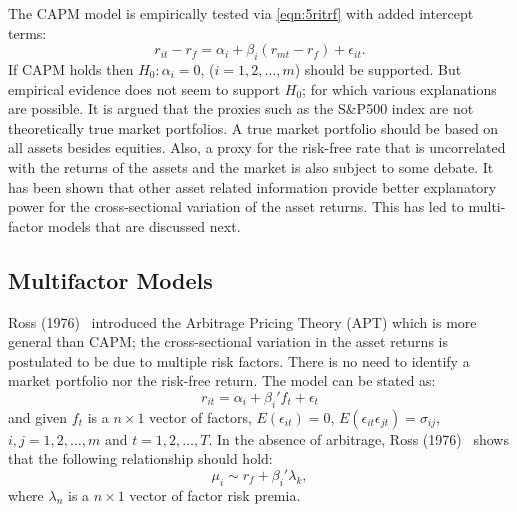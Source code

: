 \noindent The CAPM model is empirically tested via \eqref{eqn:5ritrf} with added intercept terms:
	\begin{equation}\label{eqn:intercept}
	r_{it} - r_f = \alpha_i + \beta_i (r_{mt} - r_f) + \epsilon_{it}.
	\end{equation}
If CAPM holds then $H_0: \alpha_i=0$, ($i=1,2,\ldots,m$) should be supported. But empirical evidence does not seem to support $H_0$; for which various explanations are possible. It is argued that the proxies such as the S\&P500 index are not theoretically true market portfolios. A true market portfolio should be based on all assets besides equities. Also, a proxy for the risk-free rate that is uncorrelated with the returns of the assets and the market is also subject to some debate. It has been shown that other asset related information provide better explanatory power for the cross-sectional variation of the asset returns. This has led to multi-factor models that are discussed next. 


\subsection{Multifactor Models}

Ross (1976)~\cite{rossarb} introduced the Arbitrage Pricing Theory (APT) which is more general than CAPM; the cross-sectional variation in the asset returns is postulated to be due to multiple risk factors. There is no need to identify a market portfolio nor the risk-free return. The model can be stated as:
	\begin{equation}\label{eqn:arbrit}
	r_{it} = \alpha_i + \beta_i' f_t + \epsilon_t
	\end{equation}
and given $f_t$ is a $n \times 1$ vector of factors, $E(\epsilon_{it})=  0$, $E(\epsilon_{it}\epsilon_{jt})= \sigma_{ij}$, $i,j= 1, 2, \ldots, m$ and $t= 1, 2, \ldots, T$. In the absence of arbitrage, Ross (1976)~\cite{rossarb} shows that the following relationship should hold:
	\begin{equation} \label{eqn:mewirf}
	\mu_i \sim r_f + \beta_i' \lambda_k,
	\end{equation}
where $\lambda_n$ is a $n \times 1$ vector of factor risk premia.


